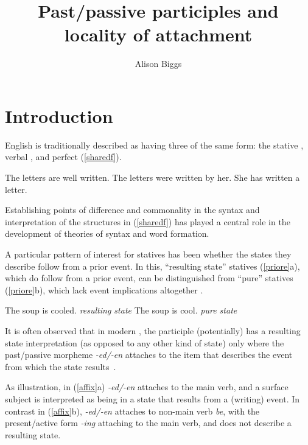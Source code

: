 \documentclass[output=paper]{langsci/langscibook}
\title{Past/passive participles and locality of attachment}
\author{Alison Biggs\affiliation{Georgetown University}}
\begin{document}
\glsresetall

\maketitle

\section{Introduction}

English is traditionally described as having three  of the same
form: the stative , verbal , and perfect (\ref{sharedf}).

\begin{exe}
\ex\label{sharedf}
    \begin{xlist}
    \ex The letters are well written.
    \ex The letters were written by her.
    \ex She has written a letter.
    \end{xlist}
\end{exe}

Establishing points of difference and commonality in the syntax and
interpretation of the structures in (\ref{sharedf}) has played a central role
in the development of theories of syntax and word formation.

A particular pattern of interest for statives has been whether the states they
describe follow from a prior event. In this, \enquote{resulting state} statives
(\ref{priore}a), which do follow from a prior event, can be distinguished from
\enquote{pure} statives (\ref{priore}b), which lack event implications altogether
\citep{Parsons1990a, Embick2004a}.

\begin{exe}
\ex\label{priore}
    \begin{xlist}
    \ex The soup is cooled. \hfill \emph{resulting state}
    \ex The soup is cool. \hfill \emph{pure state}
    \end{xlist}
\end{exe}

It is often observed that in modern , the participle (potentially)
has a resulting state interpretation (as opposed to any other kind of state)
only where the past/passive morpheme \emph{-ed/-en} attaches to the item that
describes the event from which the state results~\citep[e.g.\ ][]{Parsons1990a,
Kratzer2001a, Alexiadou2008a, AlexiadouEtAl2015}.

As illustration, in (\ref{affix}a) \emph{-ed/-en} attaches to the main verb,
and a surface subject is interpreted as being in a state that results from a
(writing) event. In  contrast in (\ref{affix}b), \emph{-ed/-en} attaches to
non-main verb \emph{be}, with the present/active form \emph{-ing} attaching to
the main verb, and does not describe a resulting state.
\end{document}
